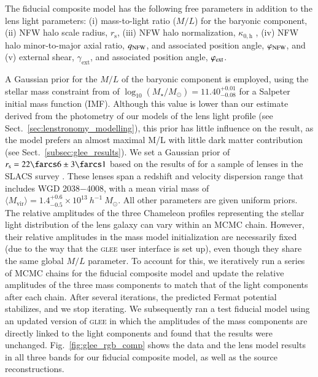 \documentclass[longauth]{aa}
\newcommand{\lensname}{WGD 2038$-$4008}
\newcommand{\ajsiii}[1]{{{#1}}}
\newcommand{\lreply}[1]{{{#1}}}
\begin{document}
The fiducial composite model has the following free parameters in addition to the lens light parameters:
(i) \ajsiii{mass-to-light ratio ($M/L$)} for the baryonic component,
(ii)  NFW halo scale radius, $r_{\mathrm{s}}$, (iii) NFW halo normalization, $\kappa_{0,\mathrm{h}}$ \citep[defined as $\kappa_{0,\mathrm{h}} \equiv 4\kappa_{\mathrm{s}} \equiv 4 \rho_{\rm s} r_{\rm s} \Sigma_{\mathrm{crit}}^{-1}$;][]{Golse02},
(iv) NFW halo minor-to-major axial ratio, \ajsiii{$q_{\rm NFW}$}, and associated position angle, \ajsiii{$\varphi_{\rm NFW}$}, and (v) external shear, $\gamma_{\mathrm{ext}}$, and associated position angle, \ajsiii{$\varphi_{\rm ext}$}.


A Gaussian prior for the \ajsiii{$M/L$} of the baryonic component is employed, using the stellar mass constraint from \citet{Agnello18c} of $\log_{10} (M_{\star}/M_{\odot}) = 11.40^{+0.01}_{-0.08}$ for a Salpeter initial mass function (IMF).  Although this value is lower than our estimate derived from the photometry of our models of the lens light profile (see Sect.~\ref{sec:lenstronomy_modelling}), this prior has little influence on the result, as the model prefers an almost maximal M/L with little dark matter contribution (see Sect.~\ref{subsec:glee_results}).  We set a Gaussian prior of $r_{\mathrm{s}} = 22\farcs6 \pm 3\farcs1$ based on the results of \citet{Gavazzi07} for a sample of lenses in the SLACS survey \citep[][]{Bolton06}.  These lenses span a redshift and velocity dispersion range that includes \lensname, with a mean virial mass of $\langle M_{\mathrm{vir}} \rangle = 1.4_{-0.5}^{+0.6} \times 10^{13}~h^{-1}~M_{\odot}$.  All other parameters are given uniform priors.  The relative amplitudes of the three Chameleon profiles representing the stellar light distribution of the lens galaxy can vary within an MCMC chain. However, their relative amplitudes in the mass model initialization are necessarily fixed (due to the way that the \textsc{glee} user interface is set up), even though they share the same global \ajsiii{$M/L$} parameter. To account for this, we iteratively run a series of MCMC chains for the fiducial composite model and update the relative amplitudes of the three mass components to match that of the light components after each chain.  After several iterations, the predicted Fermat potential stabilizes, and we stop iterating.  We subsequently ran a test fiducial model using an updated version of \textsc{glee} in which the amplitudes of the mass components are directly linked to the light components and found that the results were unchanged.  \lreply{Fig.}~\ref{fig:glee_rgb_comp} shows the data and the lens model results in all three bands for our fiducial composite model, as well as the source reconstructions.
\end{document}
